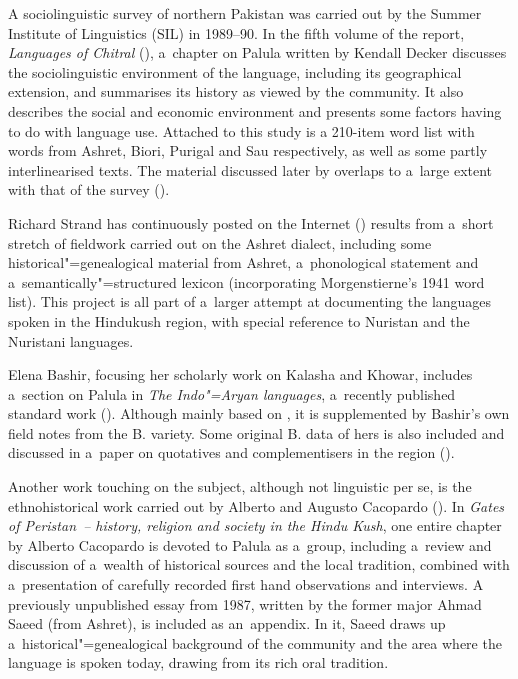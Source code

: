 A sociolinguistic survey of northern Pakistan was carried out by the Summer Institute of Linguistics
(SIL) in 1989--90. In the fifth volume of the report, \textit{Languages of Chitral}
(\citealt{decker1992a}), a~chapter on Palula written by Kendall Decker discusses the
sociolinguistic environment of the language, including its geographical extension, and summarises
its history as viewed by the community. It also describes the social and economic environment and
presents some factors having to do with language use. Attached to this study is a 210-item word list
with words from Ashret, Biori, Purigal and Sau respectively, as well as some partly interlinearised
texts. The material discussed later by \citet{decker1992b,decker1996} overlaps to a~large
extent with that of the survey (\citeyear{decker1992a}).


Richard Strand has continuously posted on the Internet (\citeyear{strand1997/2015})
results from a~short stretch of fieldwork carried out on the Ashret dialect, including
some historical"=genealogical material from Ashret, a~phonological statement and
a~semantically"=structured lexicon (incorporating Morgenstierne's 1941 word list). This project is
all part of a~larger attempt at documenting the languages spoken in the Hindukush region, with
special reference to Nuristan and the Nuristani languages.


Elena Bashir, focusing her scholarly work on Kalasha and Khowar, includes a~section on Palula in
\textit{The Indo"=Aryan languages}, a~recently published standard work
(\citeyear{bashir2003}). Although mainly based on \citet{morgenstierne1941}, it is supplemented by
Bashir's own field notes from the B. variety. Some original B. data of hers is also included and
discussed in a~paper on quotatives and complementisers in the region (\citeyear{bashir1996}).


Another work touching on the subject, although not linguistic per se, is the ethnohistorical work
carried out by Alberto and Augusto Cacopardo (\citeyear{cacopardo2001}). In \textit{Gates of
  Peristan~-- history, religion and society in the Hindu Kush}, one entire chapter by Alberto
Cacopardo is devoted to Palula as a~group, including a~review and discussion of a~wealth of
historical sources and the local tradition, combined with a~presentation of carefully recorded first
hand observations and interviews. A previously unpublished essay from 1987, written by the former
major Ahmad Saeed (from Ashret), is included as an~appendix. In it, Saeed draws up
a~historical"=genealogical background of the community and the area where the language is spoken
today, drawing from its rich oral tradition.


